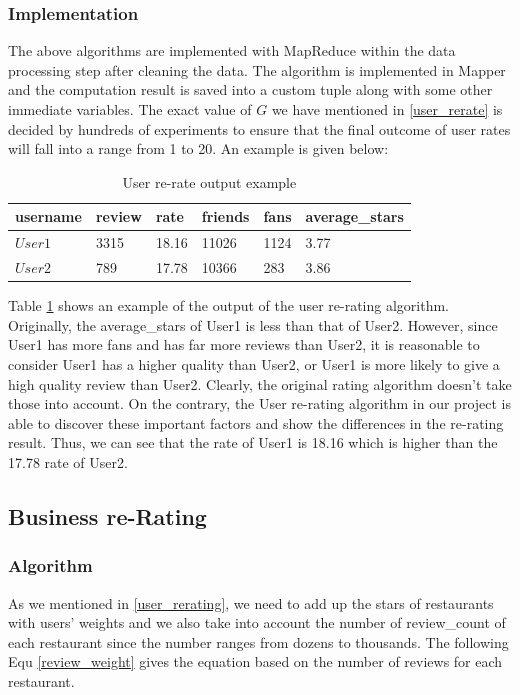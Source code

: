 \documentclass{stylefiles/capstone}
\begin{document}
\subsubsection{\textbf{Implementation}}
The above algorithms are implemented with MapReduce within the data processing step after cleaning the data. The algorithm is implemented in Mapper and the computation result is saved into a custom tuple along with some other immediate variables. The exact value of $G$ we have mentioned in \ref{user_rerate} is decided by hundreds of experiments to ensure that the final outcome of user rates will fall into a range from 1 to 20. An example is given below:
\begin{table}[h!]
\centering
\begin{tabular}{llllll} 
 \hline
username & review & rate & friends & fans & average\_stars   \\ [0.5ex] 
 \hline
$ User1 $ & 3315 & 18.16 & 11026 & 1124 & 3.77  \\
$ User2 $ & 789 & 17.78 & 10366 & 283 & 3.86  \\
 \hline
\end{tabular}
\caption{User re-rate output example}

\label{user_rerating_output}
\end{table}
Table \ref{user_rerating_output} shows an example of the output of the user re-rating algorithm. Originally, the average\_stars of User1 is less than that of User2. However, since User1 has more fans and has far more reviews than User2, it is reasonable to consider User1 has a higher quality than User2, or User1 is more likely to give a high quality review than User2. Clearly, the original rating algorithm doesn't take those into account. On the contrary, the User re-rating algorithm in our project is able to discover these important factors and show the differences in the re-rating result. Thus, we can see that the rate of User1 is 18.16 which is higher than the 17.78 rate of User2.


\subsection{Business re-Rating}
\subsubsection{Algorithm}
As we mentioned in \ref{user_rerating}, we need to add up the stars of restaurants with users' weights and we also take into account the number of review\_count of each restaurant since the number ranges from dozens to thousands. The following Equ \ref{review_weight} gives the equation based on the number of reviews for each restaurant.  
\end{document}
